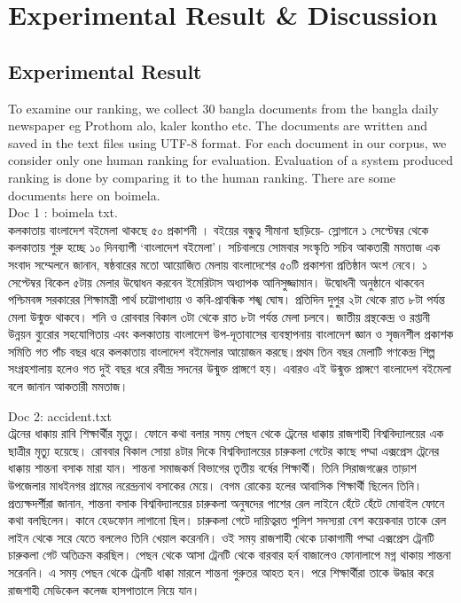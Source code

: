 \chapter{Experimental Result \& Discussion}
\label{Ch_Chapter5}


\section{Experimental Result}

To examine our ranking, we collect 30 bangla documents from the bangla daily newspaper eg Prothom alo, kaler kontho etc. The documents are written and saved in the text files using UTF-8 format. For each document in our corpus, we consider only one human ranking for evaluation. Evaluation of a system produced ranking is done by comparing it to the human ranking. There are some documents here on boimela.\\

Doc 1 : boimela txt.\\
{\unicodefont কলকাতায় বাংলাদেশ বইমেলা থাকছে ৫০ প্রকাশনী । বইয়ের বন্ধুত্ব সীমানা ছাড়িয়ে- স্লোগানে ১ সেপ্টেম্বর থেকে কলকাতায় শুরু হচ্ছে ১০ দিনব্যাপী ‘বাংলাদেশ বইমেলা’। সচিবালয়ে সোমবার সংস্কৃতি সচিব আকতারী মমতাজ এক সংবাদ সম্মেলনে জানান, ষষ্ঠবারের মতো আয়োজিত মেলায় বাংলাদেশের ৫০টি প্রকাশনা প্রতিষ্ঠান অংশ নেবে। ১ সেপ্টেম্বর বিকেল ৫টায় মেলার উদ্বোধন করবেন ইমেরিটাস অধ্যাপক আনিসুজ্জামান। উদ্বোধনী অনুষ্ঠানে থাকবেন পশ্চিমবঙ্গ সরকারের শিক্ষামন্ত্রী পার্থ চট্টোপাধ্যায় ও কবি-প্রাবন্ধিক শঙ্খ ঘোষ। প্রতিদিন দুপুর ২টা থেকে রাত ৮টা পর্যন্ত মেলা উন্মুক্ত থাকবে। শনি ও রোববার বিকাল ৩টা থেকে রাত ৮টা পর্যন্ত মেলা চলবে।
জাতীয় গ্রন্থকেন্দ্র ও রপ্তানী উন্নয়ন ব্যুরোর সহযোগিতায় এবং কলকাতায় বাংলাদেশ উপ-দূতাবাসের ব্যবস্থাপনায় বাংলাদেশ জ্ঞান ও সৃজনশীল প্রকাশক সমিতি গত পাঁচ বছর ধরে কলকাতায় বাংলাদেশ বইমেলার আয়োজন করছে।প্রথম তিন বছর মেলাটি গণকেন্দ্র শিল্প সংগ্রহশালায় হলেও গত দুই বছর ধরে রবীন্দ্র সদনের উন্মুক্ত প্রাঙ্গণে হয়। এবারও এই উন্মুক্ত প্রাঙ্গণে বাংলাদেশ বইমেলা বলে জানান আকতারী মমতাজ।}


Doc 2: accident.txt\\

{\unicodefont ট্রেনের ধাক্কায় রাবি শিক্ষার্থীর মৃত্যু। ফোনে কথা বলার সময় পেছন থেকে ট্রেনের ধাক্কায় রাজশাহী বিশ্ববিদ্যালয়ের এক ছাত্রীর মৃত্যু হয়েছে। রোববার বিকাল সোয়া ৪টার দিকে বিশ্ববিদ্যালয়ের চারুকলা গেটের কাছে পদ্মা এক্সপ্রেস ট্রেনের ধাক্কায় শান্তনা বসাক মারা যান।  শান্তনা সমাজকর্ম বিভাগের তৃতীয় বর্ষের শিক্ষার্থী। তিনি সিরাজগঞ্জের তাড়াশ উপজেলার মাধইনগর গ্রামের নরেন্দ্রনাথ বসাকের মেয়ে। বেগম রোকেয় হলের আবাসিক শিক্ষার্থী ছিলেন তিনি। প্রত্যক্ষদর্শীরা জানান, শান্তনা বসাক বিশ্ববিদ্যালয়ের চারুকলা অনুষদের পাশের রেল লাইনে হেঁটে হেঁটে মোবাইল ফোনে কথা বলছিলেন। কানে হেডফোন লাগানো ছিল। চারুকলা গেটে দায়িত্বরত পুলিশ সদস্যরা বেশ কয়েকবার তাকে রেল লাইন থেকে সরে যেতে বললেও তিনি খেয়াল করেননি।   ওই সময় রাজশাহী থেকে ঢাকাগামী পদ্মা এক্সপ্রেস ট্রেনটি চারুকলা গেট অতিক্রম করছিল। পেছন থেকে আসা ট্রেনটি থেকে বারবার হর্ন বাজালেও ফোনালাপে মগ্ন থাকায় শান্তনা সরেননি। এ সময় পেছন থেকে ট্রেনটি ধাক্কা মারলে শান্তনা গুরুতর আহত হন। পরে শিক্ষার্থীরা তাকে উদ্ধার করে রাজশাহী মেডিকেল কলেজ হাসপাতালে নিয়ে যান।}



